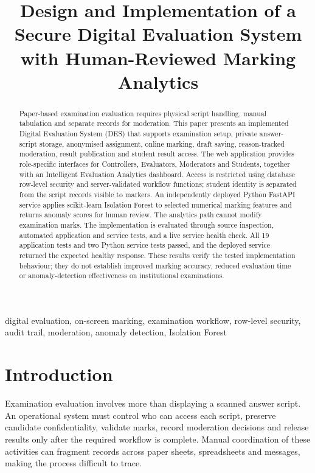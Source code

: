 \documentclass[conference]{IEEEtran}
\begin{document}
\title{Design and Implementation of a Secure Digital Evaluation System\\with Human-Reviewed Marking Analytics}
\author{
}
\maketitle

\begin{abstract}
Paper-based examination evaluation requires physical script handling, manual tabulation and separate records for moderation. This paper presents an implemented Digital Evaluation System (DES) that supports examination setup, private answer-script storage, anonymised assignment, online marking, draft saving, reason-tracked moderation, result publication and student result access. The web application provides role-specific interfaces for Controllers, Evaluators, Moderators and Students, together with an Intelligent Evaluation Analytics dashboard. Access is restricted using database row-level security and server-validated workflow functions; student identity is separated from the script records visible to markers. An independently deployed Python FastAPI service applies scikit-learn Isolation Forest to selected numerical marking features and returns anomaly scores for human review. The analytics path cannot modify examination marks. The implementation is evaluated through source inspection, automated application and service tests, and a live service health check. All 19 application tests and two Python service tests passed, and the deployed service returned the expected healthy response. These results verify the tested implementation behaviour; they do not establish improved marking accuracy, reduced evaluation time or anomaly-detection effectiveness on institutional examinations.
\end{abstract}

\begin{IEEEkeywords}
digital evaluation, on-screen marking, examination workflow, row-level security, audit trail, moderation, anomaly detection, Isolation Forest
\end{IEEEkeywords}

\section{Introduction}
Examination evaluation involves more than displaying a scanned answer script. An operational system must control who can access each script, preserve candidate confidentiality, validate marks, record moderation decisions and release results only after the required workflow is complete. Manual coordination of these activities can fragment records across paper sheets, spreadsheets and messages, making the process difficult to trace.
\end{document}

